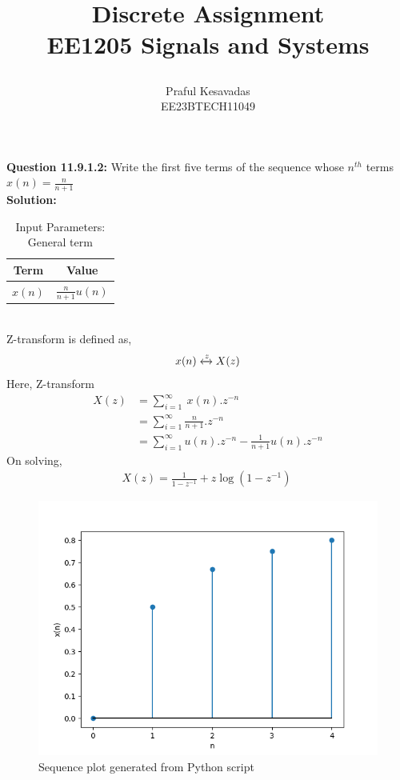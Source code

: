 \documentclass{article}
\begin{document}
\title{
\Huge\textbf{Discrete Assignment}\\
\Huge\textbf{EE1205} Signals and Systems\\
\date{}
}
\large\author{Praful Kesavadas\\EE23BTECH11049}
\maketitle

\textbf{Question 11.9.1.2:}
Write the first five terms of the sequence whose $n^{th}$ terms  $x(n) = \frac{n}{n+1}$\\
\textbf{Solution:}
\begin{table}[ht]
  \centering
  \begin{tabular}{|c|c|}
    \hline
    \textbf{Term} & \textbf{Value} \\
    \hline
    $x(n)$ & $\frac{n}{n+1}$$u(n)$ \\
    \hline
  \end{tabular}
  \caption{Input Parameters: General term}
\end{table}\\
Z-transform is defined as,\\
$$ x(n) \xleftrightarrow z  X(z)$$
Here, Z-transform
\begin{align}
X(z) &= \sum_{i=1}^\infty\ x(n).z^{-n}\\
&= \sum_{i=1}^\infty \frac{n}{n+1} . z^{-n}\\
&= \sum_{i=1}^\infty u(n).z^{-n} - \frac{1}{n+1} u(n).z^{-n}
\end{align}
On solving, 
\begin{align}
X(z) = \frac{1}{1-z^{-1}} + z\log{(1-z^{-1})}\
\end{align}
\begin{figure}[h]
    \centering
    \includegraphics[width=\columnwidth]{figs/graph1.png}
    \caption{Sequence plot generated from Python script}
    \label{fig:sequence-plot}
\end{figure}
\end{document}
